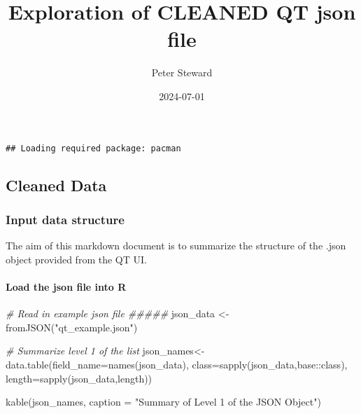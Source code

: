\documentclass[
]{article}
\title{Exploration of CLEANED QT json file}
\author{Peter Steward}
\date{2024-07-01}
\newenvironment{Shaded}{\begin{snugshade}}{\end{snugshade}}
\newcommand{\AttributeTok}[1]{\textcolor[rgb]{0.77,0.63,0.00}{#1}}
\newcommand{\CommentTok}[1]{\textcolor[rgb]{0.56,0.35,0.01}{\textit{#1}}}
\newcommand{\FunctionTok}[1]{\textcolor[rgb]{0.00,0.00,0.00}{#1}}
\newcommand{\NormalTok}[1]{#1}
\newcommand{\OtherTok}[1]{\textcolor[rgb]{0.56,0.35,0.01}{#1}}
\newcommand{\SpecialCharTok}[1]{\textcolor[rgb]{0.00,0.00,0.00}{#1}}
\newcommand{\StringTok}[1]{\textcolor[rgb]{0.31,0.60,0.02}{#1}}
\begin{document}
\maketitle

{
\setcounter{tocdepth}{6}
\tableofcontents
}
\begin{verbatim}
## Loading required package: pacman
\end{verbatim}

\hypertarget{cleaned-data}{%
\subsection{Cleaned Data}\label{cleaned-data}}

\hypertarget{input-data-structure}{%
\subsubsection{Input data structure}\label{input-data-structure}}

The aim of this markdown document is to summarize the structure of the
.json object provided from the QT UI.

\hypertarget{load-the-json-file-into-r}{%
\paragraph{Load the json file into R}\label{load-the-json-file-into-r}}

\begin{Shaded}
\begin{Highlighting}[]
\CommentTok{\# Read in example json file \#\#\#\#\#}
\NormalTok{json\_data }\OtherTok{\textless{}{-}} \FunctionTok{fromJSON}\NormalTok{(}\StringTok{"qt\_example.json"}\NormalTok{)}

\CommentTok{\# Summarize level 1 of the list}
\NormalTok{json\_names}\OtherTok{\textless{}{-}}\FunctionTok{data.table}\NormalTok{(}\AttributeTok{field\_name=}\FunctionTok{names}\NormalTok{(json\_data),}
                          \AttributeTok{class=}\FunctionTok{sapply}\NormalTok{(json\_data,base}\SpecialCharTok{::}\NormalTok{class),}
                          \AttributeTok{length=}\FunctionTok{sapply}\NormalTok{(json\_data,length))}

\FunctionTok{kable}\NormalTok{(json\_names, }\AttributeTok{caption =} \StringTok{"Summary of Level 1 of the JSON Object"}\NormalTok{)}
\end{Highlighting}
\end{Shaded}
\end{document}
